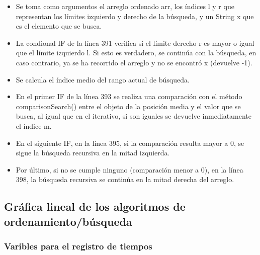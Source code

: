\documentclass{article}
\begin{document}
    
        
        \begin{itemize}	
            \item Se toma como argumentos el arreglo ordenado arr, los índices l y r que representan los límites izquierdo y derecho de la búsqueda, y un String x que es el elemento que se busca.
            \item La condional IF de la línea 391 verifica si el límite derecho r es mayor o igual que el límite izquierdo l. Si esto es verdadero, se continúa con la búsqueda, en caso contrario, ya se ha recorrido el arreglo y no se encontró x (devuelve -1).
            \item Se calcula el índice medio del rango actual de búsqueda.
            \item En el primer IF de la línea 393 se realiza una comparación con el método comparisonSearch() entre el objeto de la posición media y el valor que se busca, al igual que en el iterativo, si son iguales se devuelve inmediatamente el índice m.
            \item En el siguiente IF, en la línea 395, si la comparación resulta mayor a 0, se sigue la búsqueda recursiva en la mitad izquierda.
            \item Por último, si no se cumple ninguno (comparación menor a 0), en la línea 398, la búsqueda recursiva se continúa en la mitad derecha del arreglo.
	\end{itemize}
 
 

    \subsection{Gráfica lineal de los algoritmos de ordenamiento/búsqueda}
    
    \subsubsection{Varibles para el registro de tiempos}
    
    
	
\end{document}

